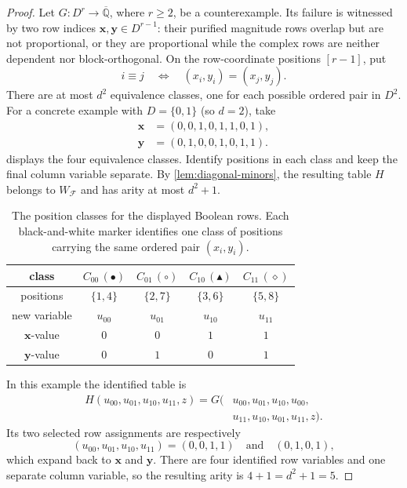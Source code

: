 \documentclass[11pt]{article}
\theoremstyle{plain}
\theoremstyle{definition}
\theoremstyle{remark}
\newcommand{\AlgNums}{\overline{\mathbb Q}}
\newcommand{\cF}{\mathcal F}
\begin{document}
\begin{proof}
Let $G:D^r\to\AlgNums$, where $r\ge2$, be a counterexample.  Its failure is
witnessed by two
row indices $\mathbf x,\mathbf y\in D^{r-1}$: their purified magnitude rows
overlap but are not proportional, or they are proportional while the complex
rows are neither dependent nor block-orthogonal.  On the row-coordinate
positions $[r-1]$, put
\[
  i\equiv j
  \quad\Longleftrightarrow\quad
  (x_i,y_i)=(x_j,y_j).
\]
There are at most $d^2$ equivalence classes, one for each possible ordered
pair in $D^2$.  For a concrete example with $D=\{0,1\}$ (so $d=2$), take
\[
\begin{aligned}
  \mathbf x&=(0,0,1,0,1,1,0,1),\\
  \mathbf y&=(0,1,0,0,1,0,1,1).
\end{aligned}
\]
 displays the four equivalence classes.  Identify
positions in each class and keep the final column variable separate.  By
\cref{lem:diagonal-minors}, the resulting table $H$ belongs to $W_{\cF}$ and
has arity at most $d^2+1$.

\begin{table}[!htbp]
  \centering
  \small
  \setlength{\tabcolsep}{3.6pt}
  \renewcommand{\arraystretch}{1.18}
  \begin{tabular}{c|cccc}
    class
      &$C_{00}\,(\bullet)$
      &$C_{01}\,(\circ)$
      &$C_{10}\,(\blacktriangle)$
      &$C_{11}\,(\diamond)$\\ \hline
    positions &$\{1,4\}$&$\{2,7\}$&$\{3,6\}$&$\{5,8\}$\\
    new variable &$u_{00}$&$u_{01}$&$u_{10}$&$u_{11}$\\
    $\mathbf x$-value &$0$&$0$&$1$&$1$\\
    $\mathbf y$-value &$0$&$1$&$0$&$1$
  \end{tabular}
  \caption{The position classes for the displayed Boolean rows.  Each
  black-and-white marker identifies one class of positions carrying the same
  ordered pair $(x_i,y_i)$.}
  \label{tab:pair-class-example}
\end{table}

In this example the identified table is
\[
\begin{aligned}
  H(u_{00},u_{01},u_{10},u_{11},z)
   =G(&u_{00},u_{01},u_{10},u_{00},\\[-2pt]
      &u_{11},u_{10},u_{01},u_{11},z).
\end{aligned}
\]
Its two selected row assignments are respectively
\[
  (u_{00},u_{01},u_{10},u_{11})=(0,0,1,1)
  \quad\text{and}\quad
  (0,1,0,1),
\]
which expand back to $\mathbf x$ and $\mathbf y$.  There are four identified
row variables and one separate column variable, so the resulting arity is
$4+1=d^2+1=5$.


\end{proof}
\end{document}
